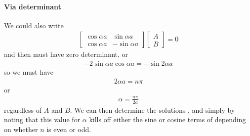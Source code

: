 {\paragraph{Via determinant}
%
We could also write
\begin{equation}\label{eqn:lecture9boundStates:160}
\begin{aligned}
\begin{bmatrix}
\cos \alpha a & \sin\alpha a \\
\cos \alpha a & - \sin\alpha a
\end{bmatrix}
\begin{bmatrix}
A \\
B
\end{bmatrix}
= 0
\end{aligned}
\end{equation}
%
and then must have zero determinant, or
%
\begin{equation}\label{eqn:PHY356Lecture9:11}
\begin{aligned}
-2 \sin\alpha a \cos\alpha a = -\sin 2 \alpha a
\end{aligned}
\end{equation}
%
so we must have
\begin{equation}\label{eqn:lecture9boundStates:180}
\begin{aligned}
2 \alpha a = n \pi
\end{aligned}
\end{equation}
%
or
\begin{equation}\label{eqn:lecture9boundStates:200}
\begin{aligned}
\alpha = \frac{n \pi}{2a}
\end{aligned}
\end{equation}
%
regardless of \(A\) and \(B\).  We can then determine the solutions , and  simply by noting that this value for \(\alpha\) kills off either the sine or cosine terms of  depending on whether \(n\) is even or odd.
%
}
